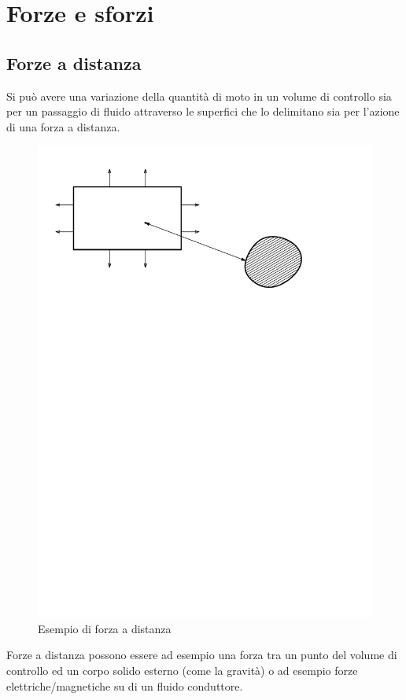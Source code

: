 %
\section{Forze e sforzi}
\subsection{Forze a distanza}
Si può avere una variazione della quantità di moto in un volume di controllo sia per un passaggio di fluido attraverso le superfici che lo delimitano sia per l'azione di una forza a distanza.
%
	\begin{figure}[ht]
		\includegraphics[scale=0.7]{./1.5 Forze e sforzi/1.5-1}
		\centering
		\caption{Esempio di forza a distanza}
	\end{figure}
%
Forze a distanza possono essere ad esempio una forza tra un punto del volume di controllo ed un corpo solido esterno (come la gravità) o ad esempio forze elettriche/magnetiche su di un fluido conduttore.

